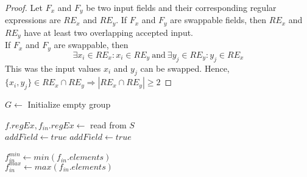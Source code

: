 \begin{proof}
  Let $F_x$ and $F_y$ be two input fields and their corresponding regular expressions are $RE_x$ and $RE_y$. If $F_x$ and $F_y$ are swappable fields, then $RE_x$ and $RE_y$ have at least two overlapping accepted input.
  \\
  If $F_x$ and $F_y$ are swappable, then 
  $$\exists x_i \in RE_x : x_i \in RE_y\ \text{and}\ \exists y_j \in RE_y : y_j \in RE_x$$ 
  This was the input values $x_i$ and $y_j$ can be swapped.
  Hence, $\{x_i, y_j\} \in RE_x \cap RE_y \Rightarrow |RE_x \cap RE_y| \geq 2$ 
\end{proof}

\begin{algorithm}[!htpb]
\footnotesize
\DontPrintSemicolon
{}
    $G\leftarrow$ Initialize empty group\\
     {
         {
                $f.regEx, f_{in}.regEx \leftarrow$ read from $S$\\        
                 {       
                     {  \label{algo:makeGroup:regEx}   
                        $addField \leftarrow true$ 
                     }
                      { 
                             { \label{algo:makeGroup:member} 
                             $addField \leftarrow true$ 
                         }
                     }  
                }
                 {
                     {\label{algo:makeGroup:menuNum} 
                    
                        $f_{in}^{min} \leftarrow min(f_{in}.elements)$\\
                        $f_{in}^{max} \leftarrow max(f_{in}.elements)$\\
                    }
                    
}}}
\end{algorithm}

